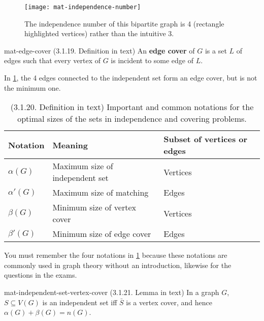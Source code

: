 \documentclass[../src/handouts/main.tex]{subfiles}
\begin{document}
\begin{figure}[htbp]
  \centering
  \texttt{[image: mat-independence-number]}
  \caption{The independence number of this bipartite graph is 4 (rectangle highlighted vertices) rather than the intuitive 3.}
  \label{fig:mat-independence-number}
\end{figure}

\begin{definition}{}{mat-edge-cover}
  (3.1.19. Definition in text)
  An \textbf{edge cover} of $G$ is a set $L$ of edges such that every vertex of $G$ is incident to some edge of $L$.
\end{definition}

In \cref{fig:mat-independence-number}, the 4 edges connected to the independent set form an edge cover, but is not the minimum one.

\begin{table}[htbp]
  \centering
  \begin{tabular}{lll}
    \hline
    \textbf{Notation} & \textbf{Meaning}                & \textbf{Subset of vertices or edges} \\ \hline
    $\alpha(G)$       & Maximum size of independent set & Vertices                             \\
    $\alpha'(G)$      & Maximum size of matching        & Edges                                \\
    $\beta(G)$        & Minimum size of vertex cover    & Vertices                             \\
    $\beta'(G)$       & Minimum size of edge cover      & Edges                                \\ \hline
  \end{tabular}
  \caption{(3.1.20. Definition in text) Important and common notations for the optimal sizes of the sets in independence and covering problems.}
  \label{tab:mat-notations}
\end{table}

You must remember the four notations in \cref{tab:mat-notations} because these notations are commonly used in graph theory without an introduction, likewise for the questions in the exams.

\begin{lemma}{}{mat-independent-set-vertex-cover}
  (3.1.21. Lemma in text)
  In a graph $G$, $S \subseteq V(G)$ is an independent set iff $\bar{S}$ is a vertex cover, and hence $\alpha(G) + \beta(G) = n(G)$.
\end{lemma}
\end{document}
